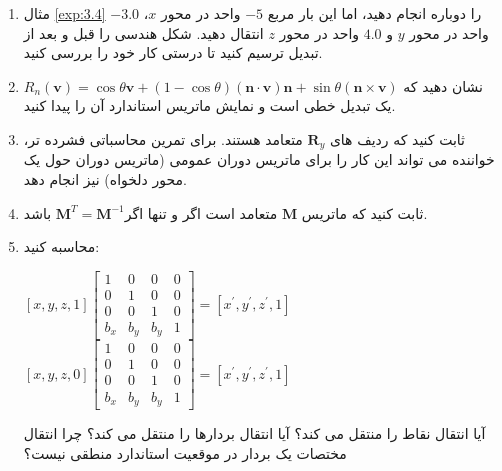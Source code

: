 {\begin{spacing}{1.5}
\begin{enumerate}[label=\textbf{\arabic*}.]
            \item {مثال \ref{exp:3.4} را دوباره انجام دهید، اما این بار مربع $-5$ واحد در محور $x$، $-3.0$ واحد در محور $y$ و $4.0$ واحد در محور $z$ انتقال دهید.
            شکل هندسی را قبل و بعد از تبدیل ترسیم کنید تا درستی کار خود را بررسی کنید.}

            \item {نشان دهید که $R_{n}(\textbf{v})=\cos\theta\textbf{v}+(1-\cos\theta)(\textbf{n}\cdot\textbf{v})\textbf{n}+\sin\theta(\textbf{n}\times\textbf{v})$ یک تبدیل خطی است و نمایش ماتریس استاندارد آن را پیدا کنید.}

            \item {ثابت کنید که ردیف های $\textbf{R}_{y}$ متعامد هستند. برای تمرین محاسباتی فشرده تر، خواننده می تواند این کار را برای ماتریس دوران عمومی (ماتریس دوران حول یک محور دلخواه) نیز انجام دهد.}

            \item {ثابت کنید که ماتریس $\textbf{M}$ متعامد است اگر و تنها اگر$\textbf{M}^{T}=\textbf{M}^{-1}$ باشد.}

            \item { محاسبه کنید:
                \begin{center}
                    $[x, y, z, 1]\begin{bmatrix}
                                     1     & 0     & 0     & 0 \\
                                     0     & 1     & 0     & 0 \\
                                     0     & 0     & 1     & 0 \\
                                     b_{x} & b_{y} & b_{y} & 1
                    \end{bmatrix}=[x^\prime, y^\prime, z^\prime,1]$ \hspace{5 mm}
                    $[x, y, z, 0]\begin{bmatrix}
                                     1     & 0     & 0     & 0 \\
                                     0     & 1     & 0     & 0 \\
                                     0     & 0     & 1     & 0 \\
                                     b_{x} & b_{y} & b_{y} & 1
                    \end{bmatrix}=[x^\prime, y^\prime, z^\prime,1]$
                \end{center}
                آیا انتقال نقاط را منتقل می کند؟ آیا انتقال بردارها را منتقل می کند؟ چرا انتقال مختصات یک بردار در موقعیت استاندارد منطقی نیست؟
            }


\end{enumerate}
\end{spacing}}
